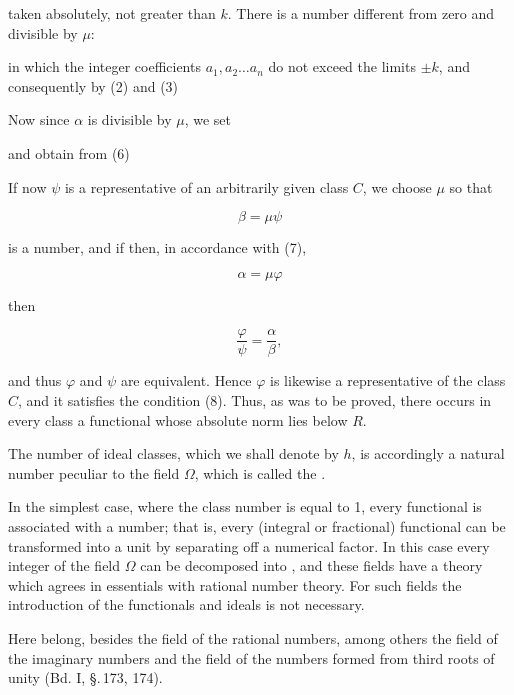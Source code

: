 taken absolutely, not greater than $k$. There is a number different from zero and divisible by $\mu$:


in which the integer coefficients $a_1, a_2 \ldots a_n$ do not exceed the limits $\pm k$, and consequently by (2) and (3)


Now since $\alpha$ is divisible by $\mu$, we set


and obtain from (6)


If now $\psi$ is a representative of an arbitrarily given class $C$, we choose $\mu$ so that

\[
\beta = \mu\psi
\]

is a number, and if then, in accordance with (7),

\[
\alpha = \mu\varphi
\]

then

\[
\frac{\varphi}{\psi} = \frac{\alpha}{\beta},
\]

and thus $\varphi$ and $\psi$ are equivalent. Hence $\varphi$ is likewise a representative of the class $C$, and it satisfies the condition (8). Thus, as was to be proved, there occurs in every class a functional whose absolute norm lies below $R$.

The number of ideal classes, which we shall denote by $h$, is accordingly a natural number peculiar to the field $\Omega$, which is called the .

In the simplest case, where the class number is equal to 1, every functional is associated with a number; that is, every (integral or fractional) functional can be transformed into a unit by separating off a numerical factor. In this case every integer of the field $\Omega$ can be decomposed into , and these fields have a theory which agrees in essentials with rational number theory. For such fields the introduction of the functionals and ideals is not necessary.

Here belong, besides the field of the rational numbers, among others the field of the  imaginary numbers and the field of the numbers formed from third roots of unity (Bd. I, \S.\,173, 174).
